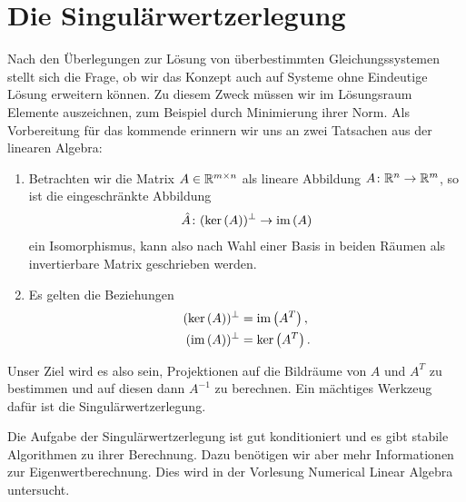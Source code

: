 \section{Die Singulärwertzerlegung}

\begin{intro}
  Nach den Überlegungen zur Lösung von überbestimmten
  Gleichungssystemen stellt sich die Frage, ob wir das Konzept auch
  auf Systeme ohne Eindeutige Lösung erweitern können. Zu diesem Zweck
  müssen wir im Lösungsraum Elemente auszeichnen, zum Beispiel durch
  Minimierung ihrer Norm.
  Als Vorbereitung für das kommende erinnern wir uns an zwei Tatsachen
  aus der linearen Algebra:

  \begin{enumerate}
  \item Betrachten wir die Matrix $A\in \mathbb R^{m\times n}$ als lineare
    Abbildung $A\colon \mathbb R^n\to \mathbb R^m$, so ist die eingeschränkte
    Abbildung
    \begin{gather}
      \hat A\colon (\operatorname{ker}\left(A\right))^\perp \to \operatorname{im}\left(A\right)
    \end{gather}
    ein Isomorphismus, kann also nach Wahl einer Basis in beiden
    Räumen als invertierbare Matrix geschrieben werden.
  \item Es gelten die Beziehungen
    \begin{gather}
      \begin{aligned}
        (\operatorname{ker}\left(A\right))^\perp &= \operatorname{im}\left(A^T\right),\\
        (\operatorname{im}\left(A\right))^\perp &= \operatorname{ker}\left(A^T\right).
      \end{aligned}
    \end{gather}
  \end{enumerate}
  
  Unser Ziel wird es also sein, Projektionen auf die Bildräume von $A$
  und $A^T$ zu bestimmen und auf diesen dann $A^{-1}$ zu
  berechnen. Ein mächtiges Werkzeug dafür ist die
  Singulärwertzerlegung.
\end{intro}



\begin{remark}
  Die Aufgabe der Singulärwertzerlegung ist gut konditioniert und es
  gibt stabile Algorithmen zu ihrer Berechnung. Dazu benötigen wir
  aber mehr Informationen zur Eigenwertberechnung. Dies wird in der
  Vorlesung \glqq Numerical Linear Algebra\grqq{} untersucht.
\end{remark}



\printindex

